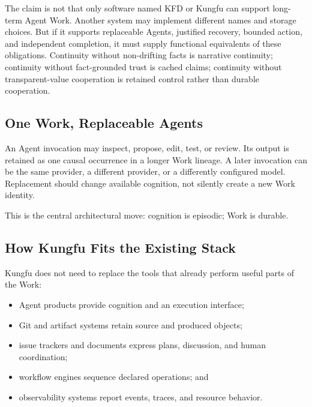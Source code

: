 
The claim is not that only software named KFD or Kungfu can support long-term
Agent Work. Another system may implement different names and storage choices.
But if it supports replaceable Agents, justified recovery, bounded action, and
independent completion, it must supply functional equivalents of these
obligations. Continuity without non-drifting facts is narrative continuity;
continuity without fact-grounded trust is cached claims; continuity without
transparent-value cooperation is retained control rather than durable
cooperation.

\subsection{One Work, Replaceable Agents}

An Agent invocation may inspect, propose, edit, test, or review. Its output is
retained as one causal occurrence in a longer Work lineage. A later invocation
can be the same provider, a different provider, or a differently configured
model. Replacement should change available cognition, not silently create a
new Work identity.

This is the central architectural move: cognition is episodic; Work is
durable.

\subsection{How Kungfu Fits the Existing Stack}

Kungfu does not need to replace the tools that already perform useful parts of
the Work:

\begin{itemize}[leftmargin=*]
  \item Agent products provide cognition and an execution interface;
  \item Git and artifact systems retain source and produced objects;
  \item issue trackers and documents express plans, discussion, and human
  coordination;
  \item workflow engines sequence declared operations; and
  \item observability systems report events, traces, and resource behavior.
\end{itemize}

